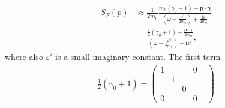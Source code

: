 \documentclass[fleqn]{article}
\begin{document}
\begin{align}
\label{7}
S_F(p)&\approx \frac{1}{2m_0}\frac{m_0(\gamma_0 + 1)- \boldsymbol{p}\cdot\boldsymbol{\gamma}}{\left(\omega-\frac{\boldsymbol{p}^2}{2m_0}\right) +\frac{\text{i}\varepsilon}{2m_0}}\nonumber\\
&=\frac{\frac{1}{2}(\gamma_0 + 1) - \frac{\boldsymbol{p}\cdot\boldsymbol{\gamma}}{2m_0}}{\left(\omega - \frac{\boldsymbol{p}^2}{2m_0}\right)+\text{i}\varepsilon'},
\end{align}
where also $\varepsilon'$ is a small imaginary constant. The first term
\begin{align*}
\frac{1}{2}(\gamma_0 + 1) = \left(\begin{matrix}
1&&&0&\\
&1&&\\
&&0&\\
0&&&0
\end{matrix}\!\!\!\!\!\!\right)
\end{align*}
\end{document}
